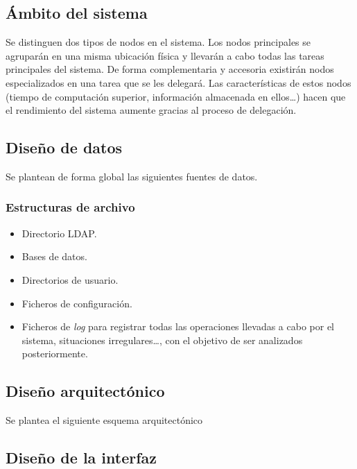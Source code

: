 \subsection{Ámbito del sistema}

Se distinguen dos tipos de nodos en el sistema. Los nodos principales se agruparán en una misma ubicación física y llevarán a cabo todas las tareas principales del sistema. De forma complementaria y accesoria existirán nodos especializados en una tarea que se les delegará. Las características de estos nodos (tiempo de computación superior, información almacenada en ellos\dots) hacen que el rendimiento del sistema aumente gracias al proceso de delegación.

\subsection{Diseño de datos}

Se plantean de forma global las siguientes fuentes de datos.


\subsubsection{Estructuras de archivo}

\begin{itemize}
  \item Directorio LDAP.
  \item Bases de datos.
  \item Directorios de usuario.
  \item Ficheros de configuración.
  \item Ficheros de \textit{log} para registrar todas las operaciones llevadas a cabo por el sistema, situaciones irregulares\dots, con el objetivo de ser analizados posteriormente.
\end{itemize}

\subsection{Diseño arquitectónico}

Se plantea el siguiente esquema arquitectónico

\citationneeded[]

\subsection{Diseño de la interfaz}

